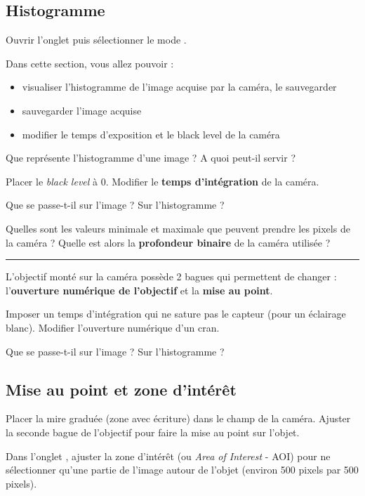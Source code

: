 \subsection{Histogramme}

\Manip Ouvrir l'onglet  puis sélectionner le mode .

\medskip

Dans cette section, vous allez pouvoir :

\begin{itemize}
	\item visualiser l'histogramme de l'image acquise par la caméra, le sauvegarder
	\item sauvegarder l'image acquise
	\item modifier le temps d'exposition et le black level de la caméra
\end{itemize}

\medskip

\Quest Que représente l'histogramme d'une image ? A quoi peut-il servir ?

\Manip Placer le \textit{black level} à 0. Modifier le \textbf{temps d'intégration} de la caméra. 

\Quest Que se passe-t-il sur l'image ? Sur l'histogramme ?

\Quest Quelles sont les valeurs minimale et maximale que peuvent prendre les pixels de la caméra ? Quelle est alors la \textbf{profondeur binaire} de la caméra utilisée ?

\noindent \rule{\linewidth}{1pt}

L'objectif monté sur la caméra possède 2 bagues qui permettent de changer : l'\textbf{ouverture numérique de l'objectif} et la \textbf{mise au point}.

\Manip Imposer un temps d'intégration qui ne sature pas le capteur (pour un éclairage blanc). Modifier l'ouverture numérique d'un cran. 

\Quest Que se passe-t-il sur l'image ? Sur l'histogramme ?


\subsection{Mise au point et zone d'intérêt}

\Manip Placer la mire graduée (zone avec écriture) dans le champ de la caméra. Ajuster la seconde bague de l'objectif pour faire la mise au point sur l'objet.

\Manip Dans l'onglet , ajuster la zone d'intérêt (ou \textit{Area of Interest} - AOI) pour ne sélectionner qu'une partie de l'image autour de l'objet (environ 500 pixels par 500 pixels).

